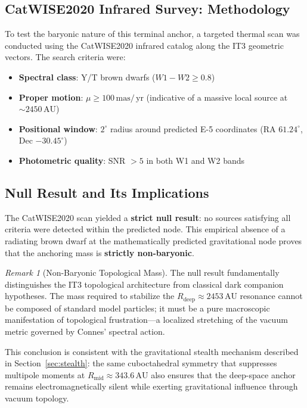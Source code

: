 \documentclass[11pt,a4paper]{article}
\theoremstyle{remark}
\newtheorem{remark}[theorem]{Remark}
\newcommand{\AU}{\,\mathrm{AU}}
\newcommand{\mas}{\,\mathrm{mas}}
\newcommand{\yr}{\,\mathrm{yr}}
\begin{document}
\subsection{CatWISE2020 Infrared Survey: Methodology}

To test the baryonic nature of this terminal anchor, a targeted thermal scan was conducted using the CatWISE2020 infrared catalog \cite{catwise2020} along the IT3 geometric vectors. The search criteria were:
\begin{itemize}[leftmargin=2em]
    \item \textbf{Spectral class}: Y/T brown dwarfs ($W1-W2 \ge 0.8$)
    \item \textbf{Proper motion}: $\mu \ge 100\mas/\yr$ (indicative of a massive local source at $\sim 2450\AU$)
    \item \textbf{Positional window}: $2^\circ$ radius around predicted E-5 coordinates (RA $61.24^\circ$, Dec $-30.45^\circ$)
    \item \textbf{Photometric quality}: SNR $> 5$ in both W1 and W2 bands
\end{itemize}

\subsection{Null Result and Its Implications}

The CatWISE2020 scan yielded a \textbf{strict null result}: no sources satisfying all criteria were detected within the predicted node. This empirical absence of a radiating brown dwarf at the mathematically predicted gravitational node proves that the anchoring mass is \textbf{strictly non-baryonic}.

\begin{remark}[Non-Baryonic Topological Mass]
The null result fundamentally distinguishes the IT3 topological architecture from classical dark companion hypotheses. The mass required to stabilize the $R_{\text{deep}} \approx 2453\AU$ resonance cannot be composed of standard model particles; it must be a pure macroscopic manifestation of topological frustration—a localized stretching of the vacuum metric governed by Connes' spectral action.
\end{remark}

This conclusion is consistent with the gravitational stealth mechanism described in Section~\ref{sec:stealth}: the same cuboctahedral symmetry that suppresses multipole moments at $R_{\text{mid}} \approx 343.6\AU$ also ensures that the deep-space anchor remains electromagnetically silent while exerting gravitational influence through vacuum topology.
\end{document}
